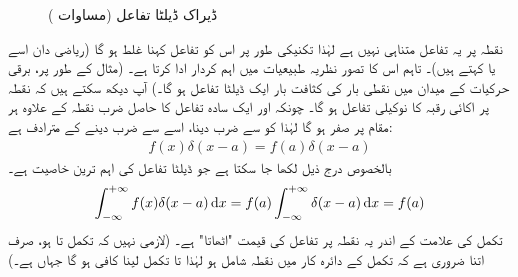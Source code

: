 \begin{figure}
\centering
{}
\caption{ڈیراک ڈیلٹا تفاعل (مساوات )}
\label{شکل_غیر_تابع_ڈیراک_ڈیلٹا_تفاعل}
\end{figure}

نقطہ    پر یہ تفاعل  متناہی نہیں ہے  لہٰذا تکنیکی طور پر اس کو تفاعل کہنا غلط ہو گا (ریاضی دان اسے  یا  کہتے ہیں)۔ تاہم اس کا تصور نظریہ طبیعیات  میں اہم کردار ادا کرتا ہے۔  (مثال کے طور پر، برقی حرکیات کے میدان میں نقطی بار کی کثافت بار ایک ڈیلٹا تفاعل ہو گا۔) آپ دیکھ سکتے ہیں کہ   نقطہ   پر اکائی رقبہ کا نوکیلی تفاعل ہو گا۔  چونکہ   اور ایک سادہ تفاعل  کا حاصل ضرب نقطہ     کے علاوہ ہر مقام پر صفر ہو گا لہٰذا  کو   سے ضرب دینا، اسے  سے ضرب دینے کے مترادف ہے:
\begin{align}
f(x)\delta(x-a)=f(a)\delta(x-a)
\end{align}
بالخصوص درج ذیل لکھا جا سکتا ہے جو  ڈیلٹا تفاعل کی اہم ترین خاصیت ہے۔ 
\begin{align}\label{مساوات_شروڈنگر_ڈیلٹا_تفاعل_اٹھاتا_ہے}
\int_{-\infty}^{+\infty}f(x)\delta(x-a)\dif{x}=f(a)\int_{-\infty}^{+\infty}\delta(x-a)\dif{x}=f(a)
\end{align}
 تکمل کی علامت کے اندر یہ نقطہ    پر تفاعل  کی قیمت "اٹھاتا" ہے۔ (لازمی نہیں کہ تکمل   تا    ہو،  صرف اتنا ضروری ہے کہ تکمل کے دائرہ کار میں نقطہ  شامل ہو لہٰذا  تا  تکمل لینا کافی ہو گا جہاں  ہے۔) 

